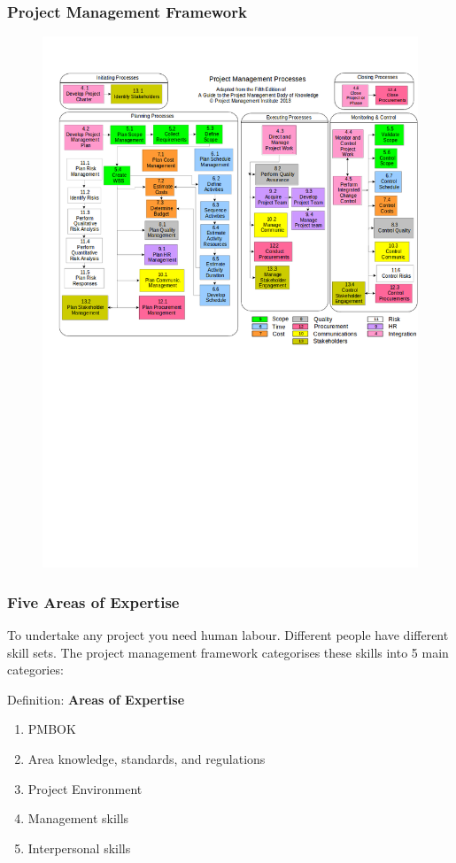 \documentclass[aspectratio=169]{beamer}
\begin{document}
\begin{frame}
\frametitle{Project Management Framework}
\begin{figure}
\includegraphics[scale=0.3]{mapping}
\end{figure}
\end{frame}

\begin{frame}
\frametitle{Five Areas of Expertise}
To undertake any project you need human labour. Different people have different skill sets. The project management framework categorises these skills into 5 main categories:
\vspace{0.5cm}
\begin{block}{Definition: \textbf{Areas of Expertise}}
\begin{enumerate}
\item PMBOK
\item Area knowledge, standards, and regulations
\item Project Environment
\item Management skills
\item Interpersonal skills
\end{enumerate}
\end{block}
\end{frame}
\end{document}
